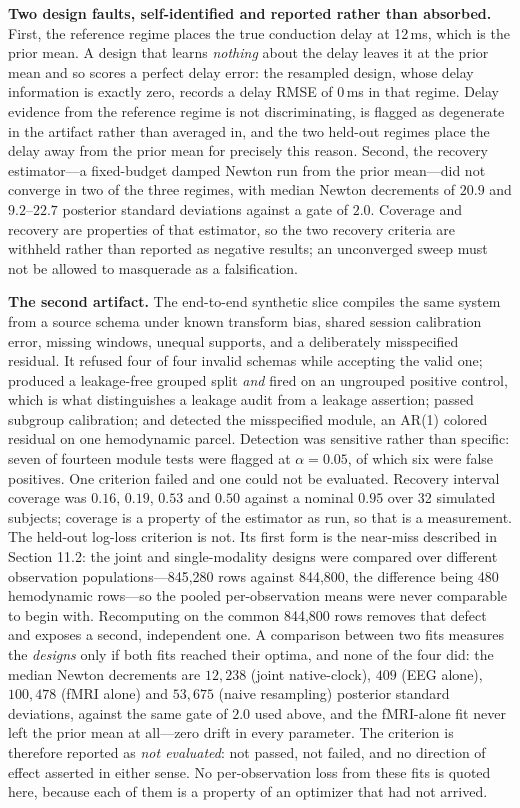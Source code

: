 \textbf{Two design faults, self-identified and reported rather than absorbed.}
First, the reference regime places the true conduction delay at 12\,ms, which is
the prior mean. A design that learns \emph{nothing} about the delay leaves it at
the prior mean and so scores a perfect delay error: the resampled design, whose
delay information is exactly zero, records a delay RMSE of \(0\,\)ms in that
regime. Delay evidence from the reference regime is not discriminating, is
flagged as degenerate in the artifact rather than averaged in, and the two
held-out regimes place the delay away from the prior mean for precisely this
reason. Second, the recovery estimator---a fixed-budget damped Newton run from
the prior mean---did not converge in two of the three regimes, with median
Newton decrements of \(20.9\) and \(9.2\)--\(22.7\) posterior standard
deviations against a gate of \(2.0\). Coverage and recovery are properties of
that estimator, so the two recovery criteria are withheld rather than reported
as negative results; an unconverged sweep must not be allowed to masquerade as a
falsification.

\textbf{The second artifact.} The end-to-end synthetic slice compiles the same
system from a source schema under known transform bias, shared session
calibration error, missing windows, unequal supports, and a deliberately
misspecified residual. It refused four of four invalid schemas while accepting
the valid one; produced a leakage-free grouped split \emph{and} fired on an
ungrouped positive control, which is what distinguishes a leakage audit from a
leakage assertion; passed subgroup calibration; and detected the misspecified
module, an AR(1) colored residual on one hemodynamic parcel. Detection was
sensitive rather than specific: seven of fourteen module tests were flagged at
\(\alpha=0.05\), of which six were false positives. One criterion failed and one
could not be evaluated. Recovery interval coverage was \(0.16\), \(0.19\),
\(0.53\) and \(0.50\) against a nominal \(0.95\) over 32 simulated subjects;
coverage is a property of the estimator as run, so that is a measurement. The
held-out log-loss criterion is not. Its first form is the near-miss described in
Section 11.2: the joint and single-modality designs were compared over different
observation populations---845{,}280 rows against 844{,}800, the difference being
480 hemodynamic rows---so the pooled per-observation means were never comparable
to begin with. Recomputing on the common 844{,}800 rows removes that defect and
exposes a second, independent one. A comparison between two fits measures the
\emph{designs} only if both fits reached their optima, and none of the four did:
the median Newton decrements are \(12{,}238\) (joint native-clock), \(409\) (EEG
alone), \(100{,}478\) (fMRI alone) and \(53{,}675\) (naive resampling) posterior
standard deviations, against the same gate of \(2.0\) used above, and the
fMRI-alone fit never left the prior mean at all---zero drift in every parameter.
The criterion is therefore reported as \emph{not evaluated}: not passed, not
failed, and no direction of effect asserted in either sense. No per-observation
loss from these fits is quoted here, because each of them is a property of an
optimizer that had not arrived.

